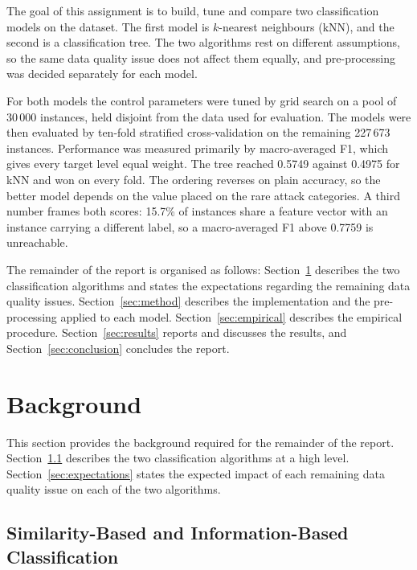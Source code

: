 \documentclass[conference]{IEEEtran}
\begin{document}
The goal of this assignment is to build, tune and compare two classification
models on the dataset. The first model is $k$-nearest neighbours (kNN), and the
second is a classification tree. The two algorithms rest on different
assumptions, so the same data quality issue does not affect them equally, and
pre-processing was decided separately for each model.

For both models the control parameters were tuned by grid search on a pool of
30\,000 instances, held disjoint from the data used for evaluation. The models
were then evaluated by ten-fold stratified cross-validation on the remaining
227\,673 instances. Performance was measured primarily by macro-averaged F1,
which gives every target level equal weight. The tree reached 0.5749 against
0.4975 for kNN and won on every fold. The ordering reverses on plain accuracy,
so the better model depends on the value placed on the rare attack categories.
A third number frames both scores: 15.7\% of instances share a feature vector
with an instance carrying a different label, so a macro-averaged F1 above
0.7759 is unreachable.

The remainder of the report is organised as follows: Section~\ref{sec:background}
describes the two classification algorithms and states the expectations regarding
the remaining data quality issues. Section~\ref{sec:method} describes the
implementation and the pre-processing applied to each model.
Section~\ref{sec:empirical} describes the empirical procedure.
Section~\ref{sec:results} reports and discusses the results, and
Section~\ref{sec:conclusion} concludes the report.

\section{Background}
\label{sec:background}

This section provides the background required for the remainder of the report.
Section~\ref{sec:algorithms} describes the two classification algorithms at a
high level. Section~\ref{sec:expectations} states the expected impact of each
remaining data quality issue on each of the two algorithms.

\subsection{Similarity-Based and Information-Based Classification}
\label{sec:algorithms}
\end{document}
